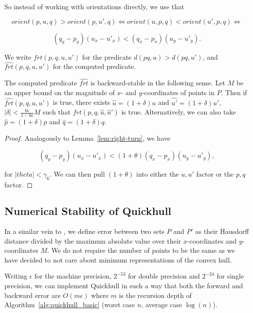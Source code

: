 So instead of working with orientations directly, we use that

$$orient(p, u, q) > orient(p, u', q) \iff orient(u, p, q) < orient(u', p, q) 
\iff$$

$$(q_y - p_y) (u_x - u'_x) < (q_x - p_x) (u_y - u'_y).$$

We write $frt(p, q, u, u')$ for the predicate $d(pq, u) > d(pq, u')$,
and $\widehat{frt}(p, q, u, u')$ for the computed predicate.



\begin{lemma}\label{lem:farther}
    The computed predicate $\widehat{frt}$ is backward-stable in the 
    following sense. Let $M$ be an upper bound on the magnitude of 
    $x$- and $y$-coordinates of points in $P$. 
    Then if $\widehat{frt}(p, q, u, u')$ is true, there exists 
    $\hat{u} = (1 + \delta)u$ and $\hat{u'} = (1 + \delta)u'$,
    $|\delta| < \frac{6\epsilon}{1 - 6\epsilon}M$
    such that $frt(p, q, \hat{u}, \hat{u}')$ is true.
    Alternatively, we can also take $\hat{p} = (1 + \delta)p$ and 
    $\hat{q} = (1 + \delta)q$.
\end{lemma}

\begin{proof}
    Analogously to Lemma~\ref{lem:right-turn}, we have

    $$(q_y - p_y) (u_x - u'_x) < (1 + \theta)(q_x - p_x) (u_y - u'_y),$$

    for $|theta| < \gamma_6$. We can then pull $(1 + \theta)$ into
    either the $u, u'$ factor or the $p, q$ factor.
\end{proof}

\subsection{Numerical Stability of Quickhull}

In a similar vein to \cite{Jiang06}, we define error between two sets
$P$ and $P'$ as their Hausdorff distance divided by the maximum absolute
value over their $x$-coordinates and $y$-coordinates $M$. We do not require
the number of points to be the same as we have decided to not care about
minimum representations of the convex hull.

\begin{theorem}
    Writing $\epsilon$ for the machine precision, $2^{-53}$ for double precision
    and $2^{-24}$ for single precision, we can implement Quickhull in such a way
    that both the forward and backward error are $O(m \epsilon)$ where $m$ is
    the recursion depth of Algorithm~\ref{alg:quickhull_basic} (worst case $n$,
    average case $\log(n)$).
\end{theorem}
